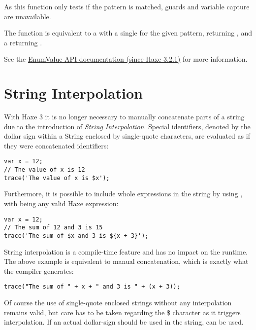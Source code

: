 As this function only tests if the pattern is matched, guards and variable capture are unavailable.

The  function is equivalent to a  with a single  for the given pattern, returning , and a  returning .


See the \href{https://api.haxe.org/haxe/EnumValueTools.html#match}{EnumValue API documentation (since Haxe 3.2.1)} for more information.



\section{String Interpolation}
\label{lf-string-interpolation}

With Haxe 3 it is no longer necessary to manually concatenate parts of a string due to the introduction of \emph{String Interpolation}. Special identifiers, denoted by the dollar sign \expr{\$} within a String enclosed by single-quote  characters, are evaluated as if they were concatenated identifiers:

\begin{lstlisting}
var x = 12;
// The value of x is 12
trace('The value of x is $x');
\end{lstlisting}
Furthermore, it is possible to include whole expressions in the string by using , with  being any valid Haxe expression:

\begin{lstlisting}
var x = 12;
// The sum of 12 and 3 is 15
trace('The sum of $x and 3 is ${x + 3}');
\end{lstlisting}
String interpolation is a compile-time feature and has no impact on the runtime. The above example is equivalent to manual concatenation, which is exactly what the compiler generates:

\begin{lstlisting}
trace("The sum of " + x + " and 3 is " + (x + 3));
\end{lstlisting}
Of course the use of single-quote enclosed strings without any interpolation remains valid, but care has to be taken regarding the \$ character as it triggers interpolation. If an actual dollar-sign should be used in the string, \expr{\$\$} can be used.



